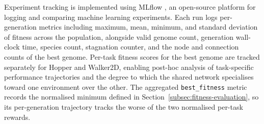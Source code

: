 Experiment tracking is implemented using MLflow \parencite{zaharia_accelerating_2018}, an open-source platform for logging and comparing machine learning experiments.
Each run logs per-generation metrics including maximum, mean, minimum, and standard deviation of fitness across the population, alongside valid genome count, generation wall-clock time, species count, stagnation counter, and the node and connection counts of the best genome.
Per-task fitness scores for the best genome are tracked separately for Hopper and Walker2D, enabling post-hoc analysis of task-specific performance trajectories and the degree to which the shared network specialises toward one environment over the other.
The aggregated \texttt{best\_fitness} metric records the normalised minimum defined in Section~\ref{subsec:fitness-evaluation}, so its per-generation trajectory tracks the worse of the two normalised per-task rewards.


